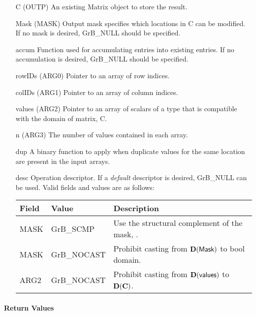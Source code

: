 \begin{itemize}[leftmargin=1.1in]
    \item[{\sf C}]      ({\sf OUTP}) An existing Matrix object to store the result.
    \item[{\sf Mask}]   ({\sf MASK}) Output mask specifies which locations in
                        {\sf C} can be modified.  If no mask is desired,
                        {\sf GrB\_NULL} should be specified.
    \item[{\sf accum}]  Function used for accumulating entries into existing
                         entries. If no accumulation is desired,
                        {\sf GrB\_NULL} should be specified.
    \item[{\sf rowIDs}] ({\sf ARG0}) Pointer to an array of row indices. 
    \item[{\sf colIDs}] ({\sf ARG1}) Pointer to an array of column indices. 
    \item[{\sf values}] ({\sf ARG2}) Pointer to an array of scalars of a type that
                                     is compatible with the domain of matrix, {\sf C}.
    \item[{\sf n}]      ({\sf ARG3}) The number of values contained in each array.
    \item[{\sf dup}]    A binary function to apply when duplicate values for
                        the same location are present in the input arrays.
                                     
    \item[{\sf desc}]   Operation descriptor. If a
    \emph{default} descriptor is desired, {\sf GrB\_NULL} can be
    used.  Valid fields and values are as follows: \\
    \begin{tabular}{lll}
    Field  & Value & Description \\
    \hline
    {\sf MASK} & {\sf GrB\_SCMP}   & Use the structural complement of the mask, . \\
    {\sf MASK} & {\sf GrB\_NOCAST} & Prohibit casting from $\bold{D}({\sf Mask})$ to {\sf bool} domain. \\
    {\sf ARG2} & {\sf GrB\_NOCAST} & Prohibit casting from $\bold{D}({\sf values})$ to $\bold{D}({\bf C})$. \\
    \end{tabular}
\end{itemize}

\paragraph{Return Values}

